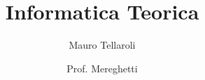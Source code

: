 \documentclass[a4paper]{article}
\begin{document}
\title{Informatica Teorica}
\author{Mauro Tellaroli}
\date{Prof. Mereghetti}
\maketitle

\tableofcontents
\clearpage

\setcounter{section}{-1}

\clearpage

\clearpage

\clearpage
\end{document}
